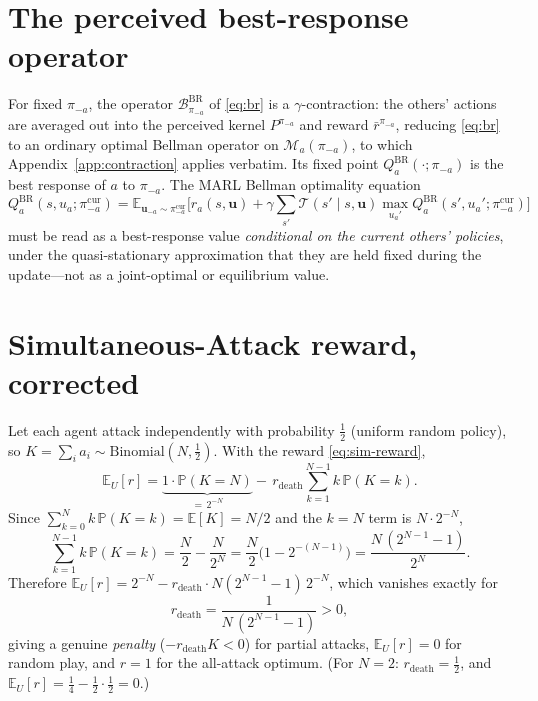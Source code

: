 \documentclass[sigconf]{aamas}
\newcommand{\uma}{\mathbf{u}_{-a}}
\newcommand{\picur}{\pi^{\mathrm{cur}}_{-a}}
\newcommand{\Qbr}{Q^{\mathrm{BR}}_{a}}
\newcommand{\Bop}{\mathcal{B}}
\begin{document}
\section{The perceived best-response operator}
\label{app:br}
For fixed $\pi_{-a}$, the operator $\Bop^{\mathrm{BR}}_{\pi_{-a}}$ of
\eqref{eq:br} is a $\gamma$-contraction: the others' actions are averaged out
into the perceived kernel $P^{\pi_{-a}}$ and reward $\bar r^{\pi_{-a}}$, reducing
\eqref{eq:br} to an ordinary optimal Bellman operator on $\mathcal{M}_a(\pi_{-a})$,
to which Appendix~\ref{app:contraction} applies verbatim. Its fixed point
$\Qbr(\cdot;\pi_{-a})$ is the best response of $a$ to $\pi_{-a}$. The MARL Bellman
optimality equation
\[
\Qbr(s,u_a;\picur)=
\mathbb{E}_{\uma\sim\picur}\Big[r_a(s,\mathbf{u})+\gamma\sum_{s'}\mathcal{T}(s'\mid s,\mathbf{u})\max_{u_a'}\Qbr(s',u_a';\picur)\Big]
\]
must be read as a best-response value \emph{conditional on the current others'
policies}, under the quasi-stationary approximation that they are held fixed
during the update---not as a joint-optimal or equilibrium value.

\section{Simultaneous-Attack reward, corrected}
\label{app:reward}
Let each agent attack independently with probability $\tfrac12$ (uniform random
policy), so $K=\sum_i a_i\sim\mathrm{Binomial}(N,\tfrac12)$. With the reward
\eqref{eq:sim-reward},
\[
\mathbb{E}_{U}[r]=\underbrace{1\cdot\mathbb{P}(K=N)}_{=\,2^{-N}}
-\,r_{\mathrm{death}}\sum_{k=1}^{N-1}k\,\mathbb{P}(K=k).
\]
Since $\sum_{k=0}^{N}k\,\mathbb{P}(K=k)=\mathbb{E}[K]=N/2$ and the $k=N$ term is
$N\cdot2^{-N}$,
\[
\sum_{k=1}^{N-1}k\,\mathbb{P}(K=k)=\frac N2-\frac{N}{2^{N}}
=\frac N2\Big(1-2^{-(N-1)}\Big)=\frac{N\,(2^{N-1}-1)}{2^{N}} .
\]
Therefore $\mathbb{E}_U[r]=2^{-N}-r_{\mathrm{death}}\cdot N(2^{N-1}-1)\,2^{-N}$,
which vanishes exactly for
\[
r_{\mathrm{death}}=\frac{1}{N\,(2^{N-1}-1)}>0,
\]
giving a genuine \emph{penalty} ($-r_{\mathrm{death}}K<0$) for partial attacks,
$\mathbb{E}_U[r]=0$ for random play, and $r=1$ for the all-attack optimum. (For
$N=2$: $r_{\mathrm{death}}=\tfrac12$, and
$\mathbb{E}_U[r]=\tfrac14-\tfrac12\cdot\tfrac12=0$.)
\end{document}
